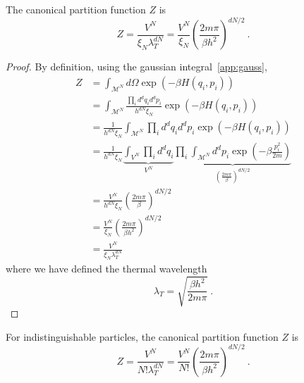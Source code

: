    The canonical partition function $Z$ is 
    \begin{equation*}
        Z = \frac{V^N}{\xi_N \lambda^{dN}_T} = \frac{V^N}{ \xi_N} (\frac{2 m \pi}{\beta h^2})^{dN/2} ~.
    \end{equation*}
    \begin{proof}
        By definition, using the gaussian integral~\eqref{app:gauss},
        \begin{equation*}
        \begin{aligned}
            Z & = \int_{\mathcal M^N} d\Omega \exp(- \beta H (q_i, p_i)) \\ & = \int_{\mathcal M^N} \frac{\prod_i d^d q_i d^d p_i}{h^{dN} \xi_N} \exp(- \beta H (q_i, p_i)) \\ & = \frac{1}{h^{dN} \xi_N} \int_{\mathcal M^N} \prod_i d^d q_i d^d p_i \exp(- \beta H (q_i, p_i)) \\ & = \frac{1}{h^{dN} \xi_N} \underbrace{\int_{ V^N} \prod_i d^d q_i}_{V^N} \underbrace{\prod_i \int_{\mathcal M^N} d^d p_i \exp(- \beta \frac{p^2_i}{2m})}_{(\frac{2 m \pi}{\beta})^{dN/2}} \\ & = \frac{V^N}{h^{dN} \xi_N} (\frac{2 m \pi}{\beta})^{dN/2} \\ & = \frac{V^N}{ \xi_N} (\frac{2 m \pi}{\beta h^2})^{dN/2} \\ & = \frac{V^N}{\xi_N \lambda^{dN}_T}
        \end{aligned}
        \end{equation*}
        where we have defined the thermal wavelength 
        \begin{equation*}
            \lambda_T = \sqrt{\frac{\beta h^2}{2 m \pi}} ~.
        \end{equation*}
    \end{proof}

    For indistinguishable particles, the canonical partition function $Z$ is 
    \begin{equation*}
        Z = \frac{V^N}{N! \lambda^{dN}_T} = \frac{V^N}{N!} (\frac{2 m \pi}{\beta h^2})^{dN/2} ~.
    \end{equation*}

